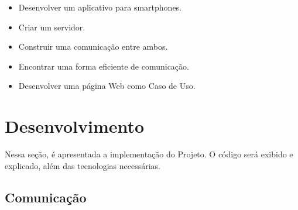 \documentclass[a4paper,12pt]{article}
\begin{document}
\begin{itemize}
    \item Desenvolver um aplicativo para smartphones.

    \item Criar um servidor.

    \item Construir uma comunicação entre ambos.

    \item Encontrar uma forma eficiente de comunicação.

    \item Desenvolver uma página Web como Caso de Uso.
\end{itemize}



\newpage
\section{Desenvolvimento}

Nessa seção, é apresentada a implementação do Projeto. O código será exibido e explicado, além das tecnologias necessárias.


\subsection{Comunicação}
\end{document}
